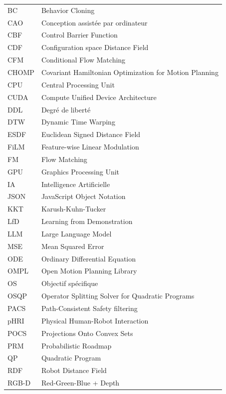 \begin{longtable}{lp{5in}}
BC         & Behavior Cloning\\
CAO        & Conception assistée par ordinateur\\
CBF        & Control Barrier Function\\
CDF        & Configuration space Distance Field\\
CFM        & Conditional Flow Matching\\
CHOMP      & Covariant Hamiltonian Optimization for Motion Planning\\
CPU        & Central Processing Unit\\
CUDA       & Compute Unified Device Architecture\\
DDL        & Degré de liberté\\
DTW        & Dynamic Time Warping\\
ESDF       & Euclidean Signed Distance Field\\
FiLM       & Feature-wise Linear Modulation\\
FM         & Flow Matching\\
GPU        & Graphics Processing Unit\\
IA         & Intelligence Artificielle\\
JSON       & JavaScript Object Notation\\
KKT        & Karush-Kuhn-Tucker\\
LfD        & Learning from Demonstration\\
LLM        & Large Language Model\\
MSE        & Mean Squared Error\\
ODE        & Ordinary Differential Equation\\
OMPL       & Open Motion Planning Library\\
OS         & Objectif spécifique\\
OSQP       & Operator Splitting Solver for Quadratic Programs\\
PACS       & Path-Consistent Safety filtering\\
pHRI       & Physical Human-Robot Interaction\\
POCS       & Projections Onto Convex Sets\\
PRM        & Probabilistic Roadmap\\
QP         & Quadratic Program\\
RDF        & Robot Distance Field\\
RGB-D      & Red-Green-Blue + Depth\\

\end{longtable}
